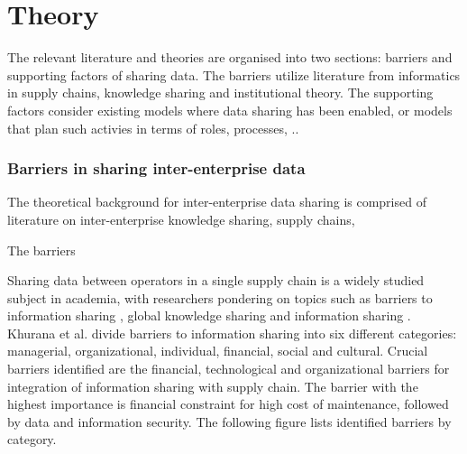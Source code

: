 \chapter{Theory}
\label{chapter:theory}

The relevant literature and theories are organised into two sections: barriers and supporting factors of sharing data. The barriers utilize literature from informatics in supply chains, knowledge sharing and institutional theory. The supporting factors consider existing models where data sharing has been enabled, or models that plan such activies in terms of roles, processes, ..

\subsection{Barriers in sharing inter-enterprise data}

The theoretical background for inter-enterprise data sharing is comprised of literature on inter-enterprise knowledge sharing, supply chains,  

The barriers




Sharing data between operators in a single supply chain is a widely studied subject in academia, with researchers pondering on topics such as barriers to information sharing \cite{khurana2011barriers}, global knowledge sharing \cite{myers2008sharing} and information sharing \cite{lee2000information}. Khurana et al. divide barriers to information sharing into six different categories: managerial, organizational, individual, financial, social and cultural. Crucial barriers identified are the financial, technological and organizational barriers for integration of information sharing with supply chain. The barrier with the highest importance is financial constraint for high cost of maintenance, followed by data and information security. The following figure lists identified barriers by category.

